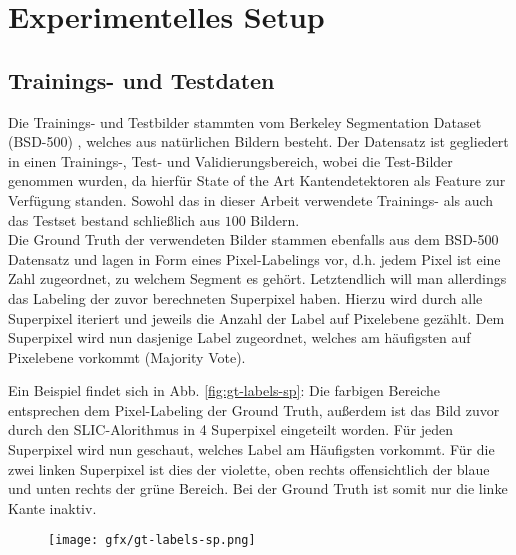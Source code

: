 \chapter{Experimentelles Setup}\label{ch:mathtest} %

\section{Trainings- und Testdaten}


Die Trainings- und Testbilder stammten vom Berkeley Segmentation Dataset (BSD-500) \cite{BSD}, welches aus natürlichen Bildern besteht. Der Datensatz ist gegliedert in einen Trainings-, Test- und Validierungsbereich, wobei die Test-Bilder genommen wurden, da hierfür State of the Art Kantendetektoren als Feature zur Verfügung standen. Sowohl das in dieser Arbeit verwendete Trainings- als auch das Testset bestand schließlich aus $100$ Bildern. \\

Die Ground Truth der verwendeten Bilder stammen ebenfalls aus dem BSD-500 Datensatz und lagen in Form eines Pixel-Labelings vor, d.h. jedem Pixel ist eine Zahl zugeordnet, zu welchem Segment es gehört. Letztendlich will man allerdings das Labeling der zuvor berechneten Superpixel haben. Hierzu wird durch alle Superpixel iteriert und jeweils die Anzahl der Label auf Pixelebene gezählt. Dem Superpixel wird nun dasjenige Label zugeordnet, welches am häufigsten auf Pixelebene vorkommt (Majority Vote). 

Ein Beispiel findet sich in Abb. \ref{fig:gt-labels-sp}: Die farbigen Bereiche entsprechen dem Pixel-Labeling der Ground Truth, außerdem ist das Bild zuvor durch den SLIC-Alorithmus in 4 Superpixel eingeteilt worden. Für jeden Superpixel wird nun geschaut, welches Label am Häufigsten vorkommt. Für die zwei linken Superpixel ist dies der violette, oben rechts offensichtlich der blaue und unten rechts der grüne Bereich. Bei der Ground Truth ist somit nur die linke Kante inaktiv. 

\vspace{1cm}

\begin{figure}[H]
	\centering
	\texttt{[image: gfx/gt-labels-sp.png]}
\end{figure}
\label{fig:gt-labels-sp}
\vspace{1cm}

